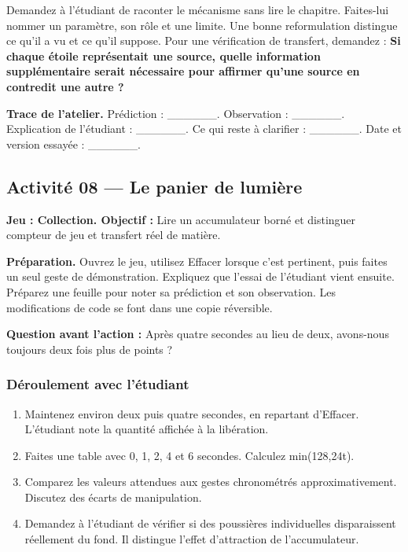 \documentclass[
  canadien,
  11pt,
  letterpaper,
]{article}
\providecommand{\tightlist}{%
  \setlength{\itemsep}{0pt}\setlength{\parskip}{0pt}}
\begin{document}
Demandez à l'étudiant de raconter le mécanisme sans lire le chapitre.
Faites-lui nommer un paramètre, son rôle et une limite. Une bonne
reformulation distingue ce qu'il a vu et ce qu'il suppose. Pour une
vérification de transfert, demandez : \textbf{Si chaque étoile
représentait une source, quelle information supplémentaire serait
nécessaire pour affirmer qu'une source en contredit une autre ?}

\textbf{Trace de l'atelier.} Prédiction : \_\_\_\_\_\_. Observation :
\_\_\_\_\_\_. Explication de l'étudiant : \_\_\_\_\_\_. Ce qui reste à
clarifier : \_\_\_\_\_\_. Date et version essayée : \_\_\_\_\_\_.

\subsection{Activité 08 --- Le panier de
lumière}\label{activituxe9-08-le-panier-de-lumiuxe8re}

\textbf{Jeu : Collection. Objectif :} Lire un accumulateur borné et
distinguer compteur de jeu et transfert réel de matière.

\textbf{Préparation.} Ouvrez le jeu, utilisez Effacer lorsque c'est
pertinent, puis faites un seul geste de démonstration. Expliquez que
l'essai de l'étudiant vient ensuite. Préparez une feuille pour noter sa
prédiction et son observation. Les modifications de code se font dans
une copie réversible.

\textbf{Question avant l'action :} Après quatre secondes au lieu de
deux, avons-nous toujours deux fois plus de points ?

\subsubsection{Déroulement avec
l'étudiant}\label{duxe9roulement-avec-luxe9tudiant-7}

\begin{enumerate}
\def\labelenumi{\arabic{enumi}.}
\tightlist
\item
  Maintenez environ deux puis quatre secondes, en repartant d'Effacer.
  L'étudiant note la quantité affichée à la libération.
\item
  Faites une table avec 0, 1, 2, 4 et 6 secondes. Calculez min(128,24t).
\item
  Comparez les valeurs attendues aux gestes chronométrés
  approximativement. Discutez des écarts de manipulation.
\item
  Demandez à l'étudiant de vérifier si des poussières individuelles
  disparaissent réellement du fond. Il distingue l'effet d'attraction de
  l'accumulateur.
\end{enumerate}
\end{document}
